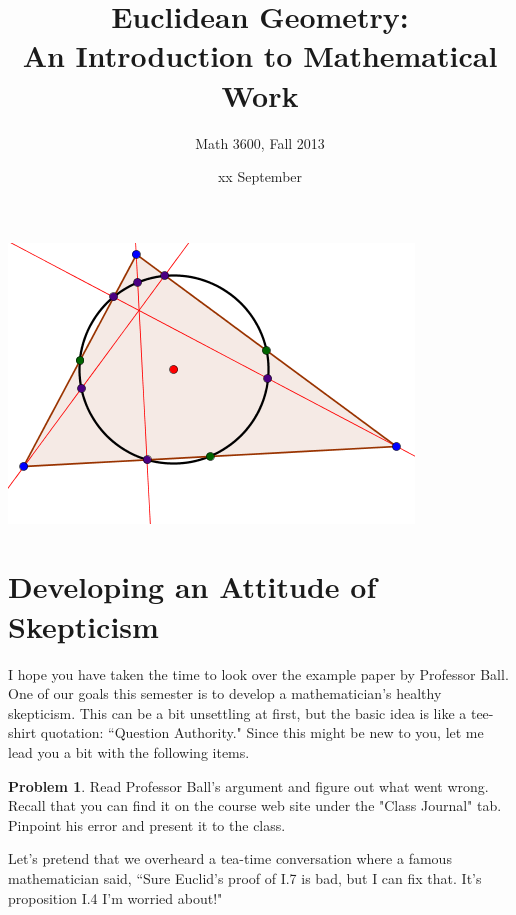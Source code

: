 \documentclass{tufte-handout}
\title{Euclidean Geometry:\\An Introduction to Mathematical Work}
\author[]{Math 3600, Fall 2013}
\date{xx September}
\theoremstyle{definition}
\newtheorem{problem}{Problem}[section]
\begin{document}
\maketitle
\begin{marginfigure}
    \includegraphics{NPC}
\end{marginfigure}

\setcounter{section}{4}
\section{Developing an Attitude of Skepticism}

I hope you have taken the time to look over the example paper by Professor Ball.
One of our goals this semester is to develop a mathematician's healthy skepticism.
This can be a bit unsettling at first, but the basic idea is like a tee-shirt quotation: ``Question Authority."
Since this might be new to you, let me lead you a bit with the following items.

\begin{problem}\label{prob:Ball}
Read Professor Ball's argument and figure out what went wrong.
Recall that you can find it on the course web site under the "Class Journal" tab.
Pinpoint his error and present it to the class.
\end{problem}

Let's pretend that we overheard a tea-time conversation where a famous mathematician said, ``Sure Euclid's proof of I.7 is bad, but I can fix that.
It's proposition I.4 I'm worried about!"
\end{document}
